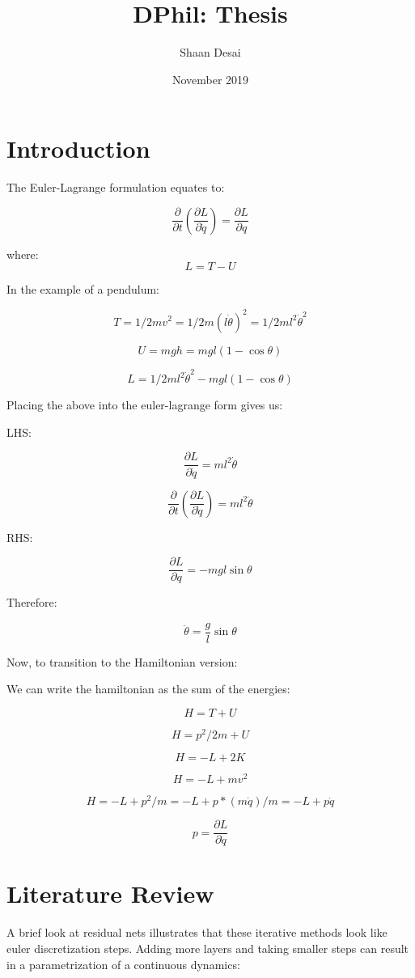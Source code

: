 \documentclass{article}
\title{DPhil: Thesis}
\author{Shaan Desai }
\date{November 2019}
\begin{document}
\maketitle

\section{Introduction}

The Euler-Lagrange formulation equates to:

$$ \frac{\partial}{\partial t} (\frac{\partial L}{\partial \dot{q}}) = \frac{\partial L}{\partial q} $$

where:
$$ L = T - U $$

In the example of a pendulum:

$$ T = 1/2 mv^2 = 1/2 m (l\dot{\theta})^2 = 1/2 m l^2 \dot{\theta}^2 $$

$$ U = mgh = mgl(1- \cos \theta) $$

$$ L = 1/2 m l^2 \dot{\theta}^2 - mgl(1-\cos\theta) $$

Placing the above into the euler-lagrange form gives us:

LHS:

$$ \frac{\partial L}{\partial \dot{q}} = ml^2 \dot{\theta}$$

$$ \frac{\partial}{\partial t} (\frac{\partial L}{\partial \dot{q}}) = ml^2 \ddot{\theta} $$

RHS:

$$ \frac{\partial L}{\partial q} = -mgl\sin\theta$$

Therefore:

$$ \ddot{\theta} = \frac{g}{l} \sin \theta $$


Now, to transition to the Hamiltonian version:

We can write the hamiltonian as the sum of the energies:

$$ H = T + U $$

$$ H = p^2/2m + U $$

$$ H = -L + 2K $$

$$ H = -L + mv^2$$

$$ H = -L + p^2/m = -L + p* (m\dot{q})/m = -L + p\dot{q}$$

$$ p = \frac{\partial L}{\partial \dot{q}} $$

\section{Literature Review}

A brief look at residual nets illustrates that these iterative methods look like euler discretization steps. Adding more layers and taking smaller steps can result in a parametrization of a continuous dynamics:
\end{document}
